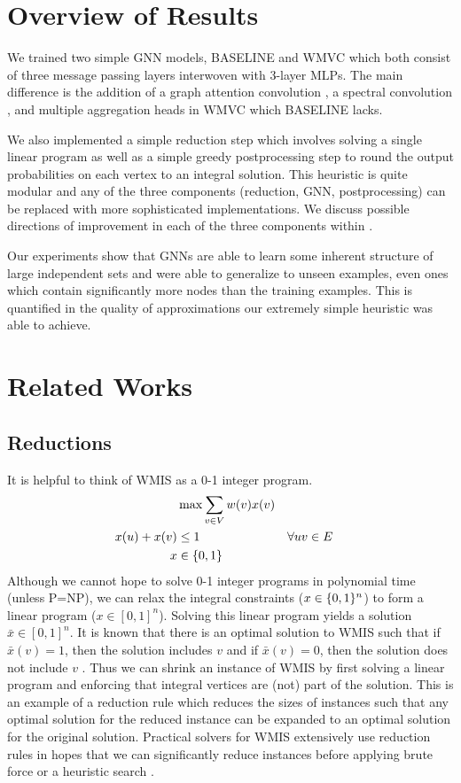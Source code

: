 \documentclass{article}
\DeclarePairedDelimiter{\set}{\lbrace}{\rbrace}
\begin{document}
\section{Overview of Results}
We trained two simple GNN models,
BASELINE and WMVC which both consist of three message passing layers
interwoven with 3-layer MLPs.
The main difference is the addition of a graph attention convolution \citet{brody2021attentive},
a spectral convolution \citet{defferrard2016conv},
and multiple aggregation heads \citet{corso2020principal, tailor2021we} in WMVC which BASELINE lacks.

We also implemented a simple reduction step which involves solving a single linear program
as well as a simple greedy postprocessing step to round the output probabilities on each vertex to an integral solution.
This heuristic is quite modular and any of the three components
(reduction, GNN, postprocessing)
can be replaced with more sophisticated implementations.
We discuss possible directions of improvement in each of the three components
within .

Our experiments show that GNNs are able to learn some inherent structure of large independent sets
and were able to generalize to unseen examples,
even ones which contain significantly more nodes than the training examples.
This is quantified in the quality of approximations our extremely simple heuristic was able to achieve.

\section{Related Works}
\subsection{Reductions}
It is helpful to think of WMIS as a 0-1 integer program.
\begin{align*}
  &\max \sum_{v\in V} w(v) x(v) \\
  x(u) + x(v) &\leq 1 &&\forall uv\in E \\
  x &\in \set{0, 1}
\end{align*}
Although we cannot hope to solve 0-1 integer programs in polynomial time
(unless P=NP),
we can relax the integral constraints ($x\in \set{0, 1}^n$)
to form a linear program ($x\in [0, 1]^n$).
Solving this linear program yields a solution $\bar x\in [0, 1]^n$.
It is known that there is an optimal solution to WMIS
such that if $\bar x(v) = 1$,
then the solution includes $v$
and if $\bar x(v) = 0$,
then the solution does not include $v$ \citet{lpreduction}.
Thus we can shrink an instance of WMIS by first solving a linear program
and enforcing that integral vertices are (not) part of the solution.
This is an example of a reduction rule
which reduces the sizes of instances
such that any optimal solution for the reduced instance can be expanded to an optimal solution
for the original solution.
Practical solvers for WMIS extensively use reduction rules
in hopes that we can significantly reduce instances
before applying brute force or a heuristic search \cite{kamis}.
\end{document}

